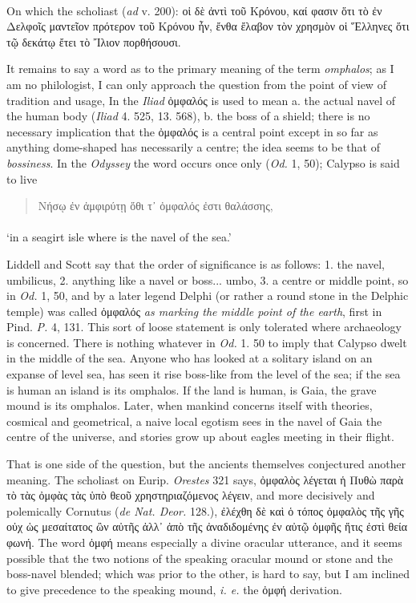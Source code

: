 \documentclass[a4paper, 11pt, oneside, polutonikogreek, english]{article}
\begin{document}
\paragraph{}
On which the scholiast (\emph{ad} v. 200): οἱ δὲ ἀντὶ τοῦ Κρόνου, καί φασιν ὅτι τὸ ἐν Δελφοῖς μαντεῖον πρότερον τοῦ Κρόνου ἦν, ἔνθα ἔλαβον τὸν χρησμὸν οἱ Ἕλληνες ὅτι τῷ δεκάτῳ ἔτει τὸ Ἴλιον πορθήσουσι.

It remains to say a word as to the primary meaning of the term \emph{omphalos}; as I am no philologist, I can only approach the question from the point of view of tradition and usage, In the \emph{Iliad} ὀμφαλός is used to mean a. the actual navel of the human body (\emph{Iliad} 4. 525, 13. 568), b. the boss of a shield; there is no necessary implication that the ὀμφαλός is a central point except in so far as anything dome-shaped has necessarily a centre; the idea seems to be that of \emph{bossiness}. In the \emph{Odyssey} the word occurs once only (\emph{Od.} 1, 50); Calypso is said to live
\begin{quotation}
Νήσῳ ἐν ἀμφιρύτῃ ὅθι τ᾽ ὀμφαλός ἐστι θαλάσσης,
\end{quotation}
\paragraph{}
`in a seagirt isle where is the navel of the sea.'

Liddell and Scott say that the order of significance is as follows: 1. the navel, umbilicus, 2. anything like a navel or boss... umbo, 3. a centre or middle point, so in \emph{Od.} 1, 50, and by a later legend Delphi (or rather a round stone in the Delphic temple) was called ὀμφαλός \emph{as marking the middle point of the earth}, first in Pind. \emph{P.} 4, 131. This sort of loose statement is only tolerated where archaeology is concerned. There is nothing whatever in \emph{Od.} 1. 50 to imply that Calypso dwelt in the middle of the sea. Anyone who has looked at a solitary island on an expanse of level sea, has seen it rise boss-like from the level of the sea; if the sea is human an island is its omphalos. If the land is human, is Gaia, the grave mound is its omphalos. Later, when mankind concerns itself with theories, cosmical and geometrical, a naive local egotism sees in the navel of Gaia the centre of the universe, and stories grow up about eagles meeting in their flight.

That is one side of the question, but the ancients themselves conjectured another meaning. The scholiast on Eurip. \emph{Orestes} 321 says, ὀμφαλὸς λέγεται ἡ Πυθὼ παρὰ τὸ τὰς ὀμφὰς τὰς ὑπὸ θεοῦ χρηστηριαζόμενος λέγειν, and more decisively and polemically Cornutus (\emph{de Nat. Deor.} 128.), ἐλέχθη δὲ καὶ ὁ τόπος ὀμφαλὸς τῆς γῆς οὐχ ὡς μεσαίτατος ὢν αὐτῆς ἀλλ᾽ ἀπὸ τῆς ἀναδιδομένης ἐν αὐτῷ ὀμφῆς ἥτις ἐστὶ θεία φωνή. The word ὀμφή means especially a divine oracular utterance, and it seems possible that the two notions of the speaking oracular mound or stone and the boss-navel blended; which was prior to the other, is hard to say, but I am inclined to give precedence to the speaking mound, \emph{i. e.} the ὀμφή derivation.
\end{document}

